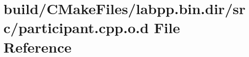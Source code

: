 \hypertarget{build_2CMakeFiles_2labpp_8bin_8dir_2src_2participant_8cpp_8o_8d}{}\section{build/\+C\+Make\+Files/labpp.bin.\+dir/src/participant.cpp.\+o.\+d File Reference}
\label{build_2CMakeFiles_2labpp_8bin_8dir_2src_2participant_8cpp_8o_8d}
